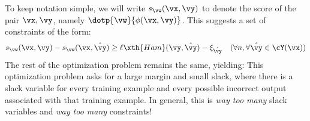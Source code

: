 To keep notation simple, we will write $s_\vw(\vx,\vy)$ to denote the score of the pair $\vx,\vy$, namely $\dotp{\vw}{\phi(\vx,\vy)}$.
This suggests a set of constraints of the form:
\begin{align} &
  s_\vw(\vx,\vy) - s_\vw(\vx,\hat\vy)
  \geq
  \ell\xth{Ham}(\vy, \hat\vy)
  - \xi_{\hat\vy}
 & (\forall n, \forall \hat\vy \in \cY(\vx))
\end{align}
The rest of the optimization problem remains the same, yielding:
%
%
This optimization problem asks for a large margin and small slack, where there is a slack variable for every training example and every possible incorrect output associated with that training example.
In general, this is \emph{way too many} slack variables and \emph{way too many} constraints!

